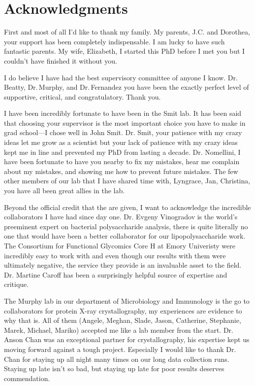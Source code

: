 
\chapter{Acknowledgments}

First and most of all I'd like to thank my family. My parents, J.C. and Dorothea, your support has been completely indispensable. I am lucky to have such fantastic parents. My wife, Elizabeth, I started this PhD before I met you but I couldn't have finished it without you. 

I do believe I have had the best supervisory committee of anyone I know. Dr.\,Beatty, Dr.\,Murphy, and  Dr.\,Fernandez you have been the exactly perfect level of supportive, critical, and congratulatory. Thank you.

I have been incredibly fortunate to have been in the Smit lab. It has been said that choosing your supervisor is the most important choice you have to make in grad school---I chose well in John Smit. Dr. Smit, your patience with my crazy ideas let me grow as a scientist but your lack of patience with my crazy ideas kept me in line and prevented my PhD from lasting a decade. Dr. Nomellini, I have been fortunate to have you nearby to fix my mistakes, hear me complain about my mistakes, and showing me how to prevent future mistakes. The few other members of our lab that I have shared time with, Lyngrace, Jan, Christina, you have all been great allies in the lab.

Beyond the official credit that the are given, I want to acknowledge the incredible collaborators I have had since day one. 
Dr. Evgeny Vinogradov is the world's preeminent expert on bacterial polysaccharide analysis, there is quite literally no one that would have been a better collaborator for our lipopolysaccharide work. The Consortium for Functional Glycomics Core H at Emory Univeristy were incredibly easy to work with and even though our results with them were ultimately negative, the service they provide is an invaluable asset to the field. Dr. Martine Caroff has been a surprisingly helpful source of expertise and critique. 

The Murphy lab in our department of Microbiology and Immunology is the go to collaborators for protein X-ray crystallography, my experiences are evidence to why that is. All of them (Angele, Meghan, Slade, Jason, Catherine, Stephanie, Marek, Michael, Mariko) accepted me like a lab member from the start. Dr. Anson Chan was an exceptional partner for crystallography, his expertise kept us moving forward against a tough project. Especially I would like to thank Dr. Chan for staying up all night many times on our long data collection runs. Staying up late isn't so bad, but staying up late for poor results deserves commendation. 

